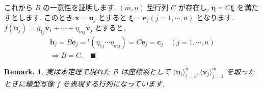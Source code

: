 \documentclass[openany, a4paper, oneside]{book}
\theoremstyle{break}
\theoremstyle{breakdefn}
\newtheorem{rem}[thm]{Remark.}
\newcommand{\bs}{\blacksquare}
\begin{document}
これから $B$ の一意性を証明します.
 $(m,n)$ 型行列 $C$ が存在し,  $\bm{\eta} = C \bm{\xi}$ を満たすとします.
このとき $\bm{x} = \bm{u}_j$ とすると $\bm{\xi} = \bm{e}_j ( j = 1,\dotsb, n)$ となります.
 $f (\bm{u}_j) = \eta_{1j} \bm{v}_1 +  \dotsb + \eta_{mj} \bm{v}_j$ とすると,
    \begin{gather}
        \bm{b}_j
        =
        B \bm{e}_j
        =
        {^t} ( \eta_{1j} \dotsb \eta_{mj} )
        =
        C \bm{e}_j
        =
        \bm{c}_j
        \quad
        (j = 1, \dotsb ,n)\\
        \Rightarrow
        B=C . \quad \bs
    \end{gather}

\begin{rem}
実は本定理で現れた $B$ は座標系として $\langle \bm{u}_i \rangle _{i=1}^n,\langle \bm{v}_j \rangle _{j=1}^m$
を取ったときに線型写像 $f$ を表現する行列になっています.
\end{rem}
\end{document}
